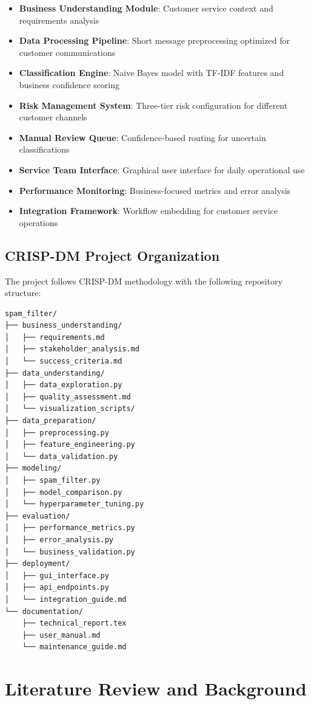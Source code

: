 \documentclass[12pt,a4paper]{article}
\begin{document}
\begin{itemize}
    \item \textbf{Business Understanding Module}: Customer service context and requirements analysis
    \item \textbf{Data Processing Pipeline}: Short message preprocessing optimized for customer communications
    \item \textbf{Classification Engine}: Naive Bayes model with TF-IDF features and business confidence scoring
    \item \textbf{Risk Management System}: Three-tier risk configuration for different customer channels
    \item \textbf{Manual Review Queue}: Confidence-based routing for uncertain classifications
    \item \textbf{Service Team Interface}: Graphical user interface for daily operational use
    \item \textbf{Performance Monitoring}: Business-focused metrics and error analysis
    \item \textbf{Integration Framework}: Workflow embedding for customer service operations
\end{itemize}

\subsection{CRISP-DM Project Organization}

The project follows CRISP-DM methodology with the following repository structure:

\begin{lstlisting}
spam_filter/
├── business_understanding/
│   ├── requirements.md
│   ├── stakeholder_analysis.md
│   └── success_criteria.md
├── data_understanding/
│   ├── data_exploration.py
│   ├── quality_assessment.md
│   └── visualization_scripts/
├── data_preparation/
│   ├── preprocessing.py
│   ├── feature_engineering.py
│   └── data_validation.py
├── modeling/
│   ├── spam_filter.py
│   ├── model_comparison.py
│   └── hyperparameter_tuning.py
├── evaluation/
│   ├── performance_metrics.py
│   ├── error_analysis.py
│   └── business_validation.py
├── deployment/
│   ├── gui_interface.py
│   ├── api_endpoints.py
│   └── integration_guide.md
└── documentation/
    ├── technical_report.tex
    ├── user_manual.md
    └── maintenance_guide.md
\end{lstlisting}

\section{Literature Review and Background}
\end{document}
